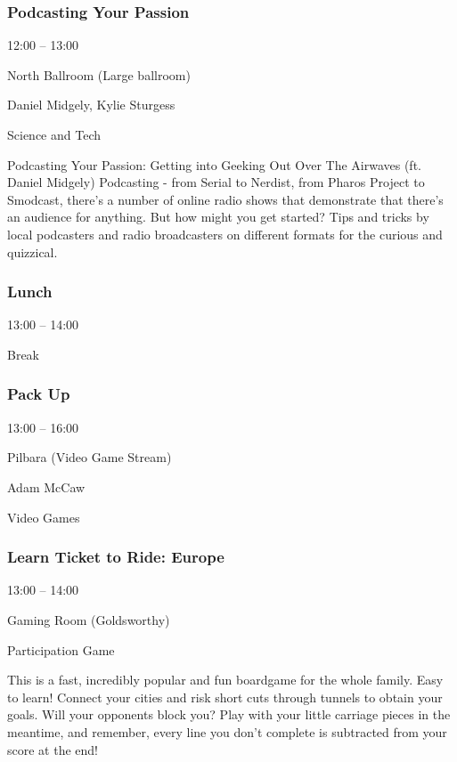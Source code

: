 \documentclass{scrreprt}
\begin{document}
\begin{multicols}{2}
\subsubsection*{Podcasting Your Passion}\begin{description}
\setlength{\itemsep}{0pt}
\setlength{\parsep}{0pt}
\setlength{\parskip}{0pt}
\item[Time:]{12:00 -- 13:00}
\item[Venue:]{North Ballroom (Large ballroom)}
\item[People:]{Daniel Midgely, Kylie Sturgess}
\item[Tags:]{Science and Tech}\end{description}
Podcasting Your Passion: Getting into Geeking Out Over The Airwaves (ft. Daniel Midgely) Podcasting - from Serial to Nerdist, from Pharos Project to Smodcast, there's a number of online radio shows that demonstrate that there's an audience for anything. But how might you get started? Tips and tricks by local podcasters and radio broadcasters on different formats for the curious and quizzical.
\subsubsection*{Lunch}\begin{description}
\setlength{\itemsep}{0pt}
\setlength{\parsep}{0pt}
\setlength{\parskip}{0pt}
\item[Time:]{13:00 -- 14:00}
\item[Tags:]{Break}\end{description}

\subsubsection*{Pack Up}\begin{description}
\setlength{\itemsep}{0pt}
\setlength{\parsep}{0pt}
\setlength{\parskip}{0pt}
\item[Time:]{13:00 -- 16:00}
\item[Venue:]{Pilbara (Video Game Stream)}
\item[People:]{Adam McCaw}
\item[Tags:]{Video Games}\end{description}

\subsubsection*{Learn Ticket to Ride: Europe}\begin{description}
\setlength{\itemsep}{0pt}
\setlength{\parsep}{0pt}
\setlength{\parskip}{0pt}
\item[Time:]{13:00 -- 14:00}
\item[Venue:]{Gaming Room (Goldsworthy)}
\item[Tags:]{Participation Game}\end{description}
This is a fast, incredibly popular and fun boardgame for the whole family. Easy to learn! Connect your cities and risk short cuts through tunnels to obtain your goals. Will your opponents block you? Play with your little carriage pieces in the meantime, and remember, every line you don't complete is subtracted from your score at the end!

\end{multicols}
\end{document}
